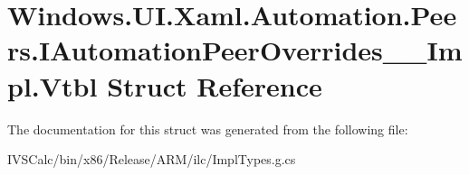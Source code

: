 \hypertarget{struct_windows_1_1_u_i_1_1_xaml_1_1_automation_1_1_peers_1_1_i_automation_peer_overrides_____impl_1_1_vtbl}{}\section{Windows.\+U\+I.\+Xaml.\+Automation.\+Peers.\+I\+Automation\+Peer\+Overrides\+\_\+\+\_\+\+Impl.\+Vtbl Struct Reference}
\label{struct_windows_1_1_u_i_1_1_xaml_1_1_automation_1_1_peers_1_1_i_automation_peer_overrides_____impl_1_1_vtbl}


The documentation for this struct was generated from the following file\+:\begin{DoxyCompactItemize}
\item 
I\+V\+S\+Calc/bin/x86/\+Release/\+A\+R\+M/ilc/Impl\+Types.\+g.\+cs\end{DoxyCompactItemize}
